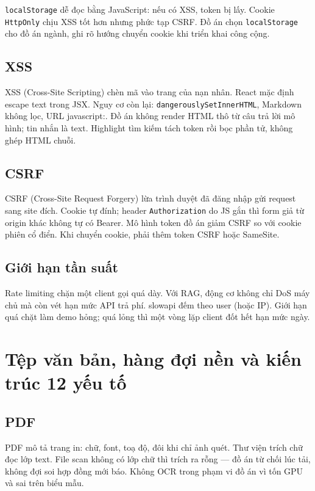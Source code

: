 \texttt{localStorage} dễ đọc bằng JavaScript: nếu có XSS, token bị lấy. Cookie
\texttt{HttpOnly} chịu XSS tốt hơn nhưng phức tạp CSRF. Đồ án chọn
\texttt{localStorage} cho đồ án ngành, ghi rõ hướng chuyển cookie khi triển khai
công cộng.

\subsection{XSS}

XSS (Cross-Site Scripting) chèn mã vào trang của nạn nhân. React mặc định escape
text trong JSX. Nguy cơ còn lại: \texttt{dangerouslySetInnerHTML}, Markdown không
lọc, URL javascript:. Đồ án không render HTML thô từ câu trả lời mô hình; tin
nhắn là text. Highlight tìm kiếm tách token rồi bọc phần tử, không ghép HTML
chuỗi.

\subsection{CSRF}

CSRF (Cross-Site Request Forgery) lừa trình duyệt đã đăng nhập gửi request sang
site đích. Cookie tự đính; header \texttt{Authorization} do JS gắn thì form giả
từ origin khác không tự có Bearer. Mô hình token đồ án giảm CSRF so với cookie
phiên cổ điển. Khi chuyển cookie, phải thêm token CSRF hoặc SameSite.

\subsection{Giới hạn tần suất}

Rate limiting chặn một client gọi quá dày. Với RAG, động cơ không chỉ DoS máy
chủ mà còn vét hạn mức API trả phí. slowapi đếm theo user (hoặc IP). Giới hạn
quá chặt làm demo hỏng; quá lỏng thì một vòng lặp client đốt hết hạn mức ngày.

\section{Tệp văn bản, hàng đợi nền và kiến trúc 12 yếu tố}

\subsection{PDF}

PDF mô tả trang in: chữ, font, toạ độ, đôi khi chỉ ảnh quét. Thư viện trích chữ
đọc lớp text. File scan không có lớp chữ thì trích ra rỗng --- đồ án từ chối lúc
tải, không đợi soi hợp đồng mới báo. Không OCR trong phạm vi đồ án vì tốn GPU
và sai trên biểu mẫu.

